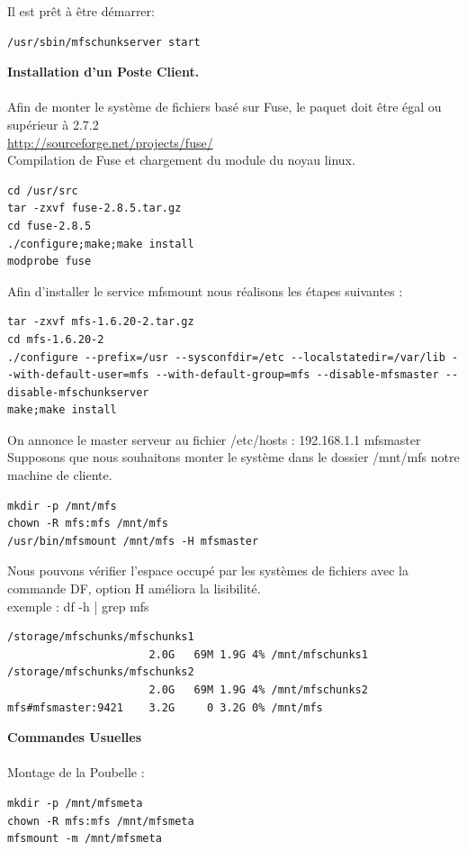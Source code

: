 \documentclass[12pt]{report}
\begin{document}
Il est prêt à être démarrer:
  \begin{lstlisting}
/usr/sbin/mfschunkserver start
	  \end{lstlisting}
\textbf{Installation d'un Poste Client.}\\\\
Afin de monter le système de fichiers basé sur Fuse, le paquet doit être égal ou supérieur à 2.7.2\\
\href{http://sourceforge.net/projects/fuse/}{http://sourceforge.net/projects/fuse/} \\
Compilation de Fuse et chargement du module du noyau linux.\\
  \begin{lstlisting}
cd /usr/src
tar -zxvf fuse-2.8.5.tar.gz
cd fuse-2.8.5
./configure;make;make install
modprobe fuse
	  \end{lstlisting}
Afin d'installer le service mfsmount nous réalisons les étapes suivantes :
  \begin{lstlisting}
tar -zxvf mfs-1.6.20-2.tar.gz
cd mfs-1.6.20-2
./configure --prefix=/usr --sysconfdir=/etc --localstatedir=/var/lib --with-default-user=mfs --with-default-group=mfs --disable-mfsmaster --disable-mfschunkserver
make;make install
	  \end{lstlisting}
On annonce le master serveur au fichier /etc/hosts : 192.168.1.1   mfsmaster\\
Supposons que nous souhaitons monter le système dans le dossier /mnt/mfs notre machine de cliente.\\
  \begin{lstlisting}
mkdir -p /mnt/mfs
chown -R mfs:mfs /mnt/mfs
/usr/bin/mfsmount /mnt/mfs -H mfsmaster
	  \end{lstlisting}
Nous pouvons vérifier l'espace occupé par les systèmes de fichiers avec la commande DF, option H améliora la lisibilité.\\
exemple : df -h | grep mfs\\
  \begin{lstlisting}
/storage/mfschunks/mfschunks1
                      2.0G   69M 1.9G 4% /mnt/mfschunks1
/storage/mfschunks/mfschunks2
                      2.0G   69M 1.9G 4% /mnt/mfschunks2
mfs#mfsmaster:9421    3.2G     0 3.2G 0% /mnt/mfs
	  \end{lstlisting}
\textbf{Commandes Usuelles}\\\\
Montage de la Poubelle :\\
\begin{lstlisting}
mkdir -p /mnt/mfsmeta
chown -R mfs:mfs /mnt/mfsmeta
mfsmount -m /mnt/mfsmeta
	  \end{lstlisting}
\end{document}
